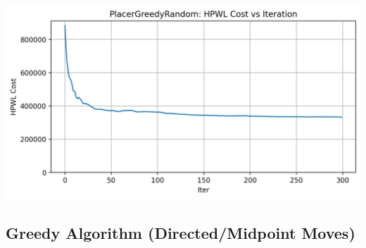 {
    \centering
    \includegraphics[width=0.7\columnwidth]{figures/results/PlacerGreedyRandom/PlacerGreedyRandom_cost_history.png}
    \label{fig:PGRCurve}
}

\subsection{Greedy Algorithm (Directed/Midpoint Moves)}
